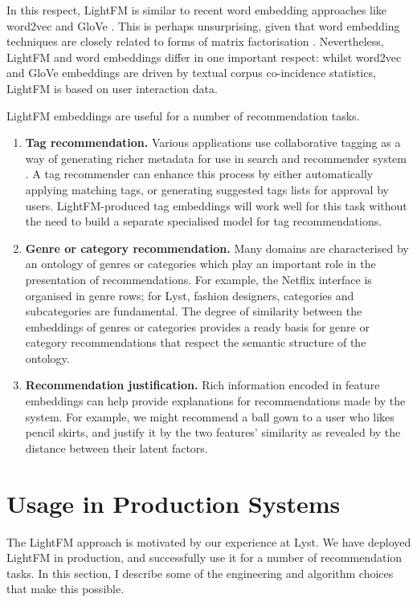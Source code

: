 \documentclass{sig-alternate}
\providecommand\authInstitution{Lyst}
\begin{document}
In this respect, LightFM is similar to recent word embedding approaches like word2vec and GloVe \cite{mikolov2013efficient, pennington2014glove}. This is perhaps unsurprising, given that word embedding techniques are closely related to forms of matrix factorisation \cite{levy2014neural}. Nevertheless, LightFM and word embeddings differ in one important respect: whilst word2vec and GloVe embeddings are driven by textual corpus co-incidence statistics, LightFM is based on user interaction data.

LightFM embeddings are useful for a number of recommendation tasks.
\begin{enumerate}
\item \textbf{Tag recommendation.} Various applications use collaborative tagging as a way of generating richer metadata for use in search and recommender system \cite{bastian2014linkedin, jaschke2007tag}. A tag recommender can enhance this process by either automatically applying matching tags, or generating suggested tags lists for approval by users. LightFM-produced tag embeddings will work well for this task without the need to build a separate specialised model for tag recommendations.
\item \textbf{Genre or category recommendation.} Many domains are characterised by an ontology of genres or categories which play an important role in the presentation of recommendations. For example, the Netflix interface is organised in genre rows; for \authInstitution{}, fashion designers, categories and subcategories are fundamental. The degree of similarity between the embeddings of genres or categories provides a ready basis for genre or category recommendations that respect the semantic structure of the ontology.
\item \textbf{Recommendation justification.} Rich information encoded in feature embeddings can help provide explanations for recommendations made by the system. For example, we might recommend a ball gown to a user who likes pencil skirts, and justify it by the two features' similarity as revealed by the distance between their latent factors.
\end{enumerate}

\section{Usage in Production Systems}
\label{sec:production}
The LightFM approach is motivated by our experience at \authInstitution{}. We have deployed LightFM in production, and successfully use it for a number of recommendation tasks. In this section, I describe some of the engineering and algorithm choices that make this possible.
\end{document}
